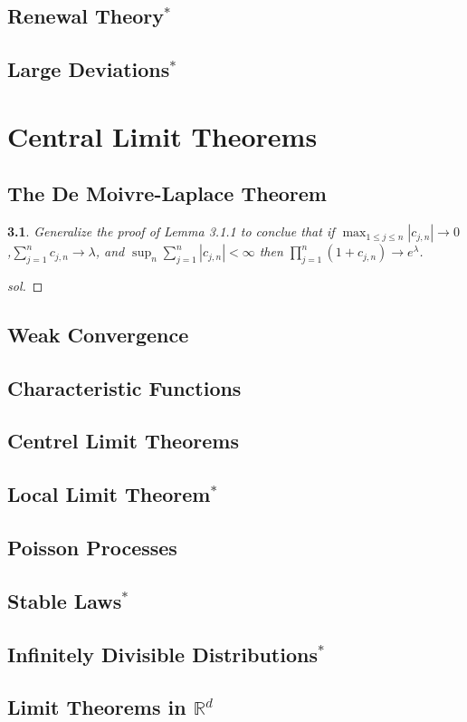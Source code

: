 \documentclass{report}
\newtheorem{ex}{}[section]
\newcommand{\R}{\mathbb R}
\begin{document}
\section{Renewal Theory$^*$}
\section{Large Deviations$^*$}

\chapter{Central Limit Theorems}
\section{The De Moivre-Laplace Theorem}
\begin{ex}
Generalize the proof of Lemma 3.1.1 to conclue that if $\max_{1\le j \le n} |c_{j,n}| \to 0$,$\sum_{j=1}^n c_{j,n} \to \lambda$, and $\sup_n \sum_{j=1}^n |c_{j,n}| < \infty$ then $\prod_{j=1}^n (1 + c_{j,n}) \to e^\lambda$.
\end{ex}
\begin{proof}[sol]
\end{proof}
\section{Weak Convergence}
\section{Characteristic Functions}
\section{Centrel Limit Theorems}
\section{Local Limit Theorem$^*$}
\section{Poisson Processes}
\section{Stable Laws$^*$}
\section{Infinitely Divisible Distributions$^*$}
\section{Limit Theorems in $\R^d$}
\end{document}
